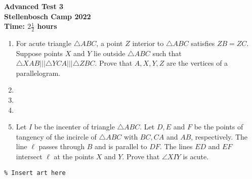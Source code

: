 \documentclass{article}
\begin{document}
\thispagestyle{empty}

\begin{center}
  \textbf{\Large Advanced Test 3}
  \\ \vspace{1em}
  \textbf{\large Stellenbosch Camp 2022}
  \\ \vspace{1em}
  \textbf{\large Time: $2\frac{1}{2}$ hours}
\end{center}

\bigskip

\begin{enumerate}[itemsep=\fill]

\item %
For acute triangle $\triangle ABC$, a point $Z$ interior to $\triangle ABC$ satisfies $ZB=ZC$. Suppose points $X$ and $Y$ lie outside $\triangle ABC$ such that $\triangle XAB |||\triangle YCA |||\triangle ZBC$. Prove that $A,X,Y,Z$ are the vertices of a parallelogram.

\item %


\item %


\item %


\item %
Let $I$ be the incenter of triangle $\triangle ABC$. Let $D,E$ and $F$ be the points of tangency of the incircle of $\triangle ABC$ with $BC,CA$ and $AB$, respectively. The line $\ell$ passes through $B$ and is parallel to $DF$. The lines $ED$ and $EF$ intersect $\ell$ at the points $X$ and $Y$. Prove that $\angle XIY$ is acute.
\end{enumerate}


\centering
\small
\begin{BVerbatim}
\end{BVerbatim}
\end{document}
